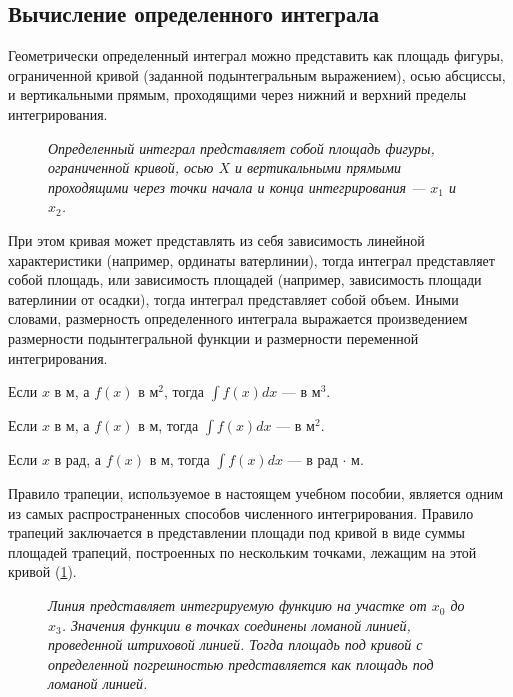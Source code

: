 \subsection{Вычисление определенного интеграла}

Геометрически определенный интеграл можно представить как площадь фигуры, ограниченной кривой (заданной подынтегральным выражением), осью абсциссы, и вертикальными прямым, проходящими через нижний и верхний пределы интегрирования.

\begin{figure}[h!]
    \centerline{}
    \caption{Геометрический смысл определенного интеграла}
    \caption*{\textit{Определенный интеграл представляет собой площадь фигуры, ограниченной кривой, осью $X$ и вертикальными прямыми проходящими через точки начала и конца интегрирования --- $x_1$ и $x_2$.}}
\end{figure}

При этом кривая может представлять из себя зависимость линейной характеристики (например, ординаты ватерлинии), тогда интеграл представляет собой площадь, или зависимость площадей (например, зависимость площади ватерлинии от осадки), тогда интеграл представляет собой объем.
Иными словами, размерность определенного интеграла выражается произведением размерности подынтегральной функции и размерности переменной интегрирования.

Если $x$ в м, а $f(x)$ в м$^2$, тогда $\int f(x) dx $ --- в м$^3$.

Если $x$ в м, а $f(x)$ в м, тогда $\int f(x) dx $ --- в м$^2$.

Если $x$ в рад, а $f(x)$ в м, тогда $\int f(x) dx $ --- в рад $\cdot$ м.


Правило трапеции, используемое в настоящем учебном пособии, является одним из самых распространенных способов численного интегрирования.
Правило трапеций заключается в представлении площади под кривой в виде суммы площадей трапеций, построенных по нескольким точками, лежащим на этой кривой (\ref{fig:trapezoids}).

\begin{figure}[h!]
    \centerline{}
    \caption{Правило трапеций}
    \caption*{\textit{Линия представляет интегрируемую функцию на участке от $x_0$ до $x_3$.
    Значения функции в точках соединены ломаной линией, проведенной штриховой линией.
    Тогда площадь под кривой с определенной погрешностью представляется как площадь под ломаной линией.}}
    \label{fig:trapezoids}
\end{figure}


